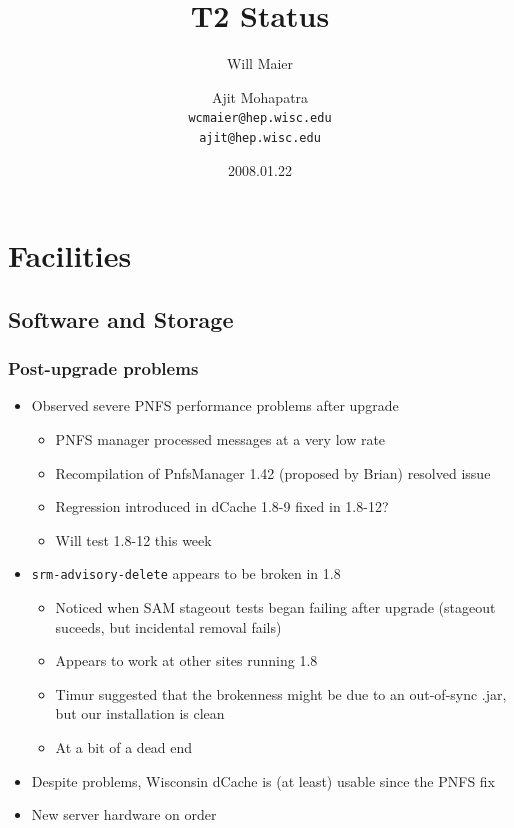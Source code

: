 \documentclass{beamer}
\title{T2 Status}
\author[Maier, Mohapatra]{
    Will Maier \and Ajit Mohapatra\\ 
    {\tt wcmaier@hep.wisc.edu}\\
    {\tt ajit@hep.wisc.edu}}
\institute[Wisconsin]{University of Wisconsin - High Energy Physics}
\date{2008.01.22}
\begin{document}
\begin{frame}
    \titlepage
\end{frame}


\section{Facilities}
\subsection{Software and Storage}
\begin{frame}
\frametitle{Post-upgrade problems}
\begin{itemize}
    \item Observed severe PNFS performance problems after upgrade
    \begin{itemize}
        \item PNFS manager processed messages at a very low rate
        \item Recompilation of PnfsManager 1.42 (proposed by Brian) resolved issue
        \item Regression introduced in dCache 1.8-9 fixed in 1.8-12?
        \item Will test 1.8-12 this week
    \end{itemize}
    \item {\tt srm-advisory-delete} appears to be broken in 1.8
    \begin{itemize}
        \item Noticed when SAM stageout tests began failing after upgrade (stageout suceeds, but incidental removal fails)
        \item Appears to work at other sites running 1.8
        \item Timur suggested that the brokenness might be due to an out-of-sync .jar, but our installation is clean
        \item At a bit of a dead end
    \end{itemize}
    \item Despite problems, Wisconsin dCache is (at least) usable since the PNFS fix
    \item New server hardware on order
\end{itemize}
\end{frame}
\end{document}
